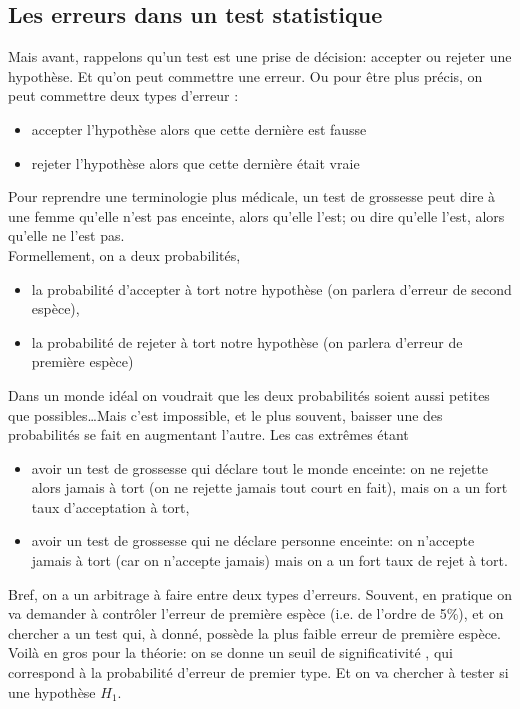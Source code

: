 \subsection*{Les erreurs dans un test statistique}
Mais avant, rappelons qu'un test est une prise de décision: accepter ou rejeter une hypothèse. Et qu'on peut commettre une erreur. Ou pour être plus précis, on peut commettre deux types d'erreur : 
\begin{itemize}
\item accepter l'hypothèse alors que cette dernière est fausse
\item rejeter l'hypothèse alors que cette dernière était vraie
\end{itemize}
Pour reprendre une terminologie plus médicale, un test de grossesse peut dire à une femme qu'elle n'est pas enceinte, alors qu'elle l'est; ou dire qu'elle l'est, alors qu'elle ne l'est pas.\newline
\\
Formellement, on a deux probabilités,
\begin{itemize}
\item la probabilité d'accepter à tort notre hypothèse (on parlera d'erreur de second espèce), 
\item la probabilité de rejeter à tort notre hypothèse (on parlera d'erreur de première espèce) 
\end{itemize}

Dans un monde idéal on voudrait que les deux probabilités soient aussi petites que possibles\dots  Mais c'est impossible, et le plus souvent, baisser une des probabilités se fait en augmentant l'autre. Les cas extrêmes étant 
\begin{itemize}
\item avoir un test de grossesse qui déclare tout le monde enceinte: on ne rejette alors jamais à tort (on ne rejette jamais tout court en fait), mais on a un fort taux d'acceptation à tort,
\item avoir un test de grossesse qui ne déclare personne enceinte: on n'accepte jamais à tort (car on n'accepte jamais) mais on a un fort taux de rejet à tort.
\end{itemize}
Bref, on a un arbitrage à faire entre deux types d'erreurs. Souvent, en pratique on va demander à contrôler l'erreur de première espèce (i.e.  de l'ordre de 5\%), et on chercher a un test qui, à  donné, possède la plus faible erreur de première espèce. Voilà en gros pour la théorie: on se donne un seuil de significativité , qui correspond à la probabilité d'erreur de premier type. Et on va chercher à tester si une hypothèse $H_{1}$.




